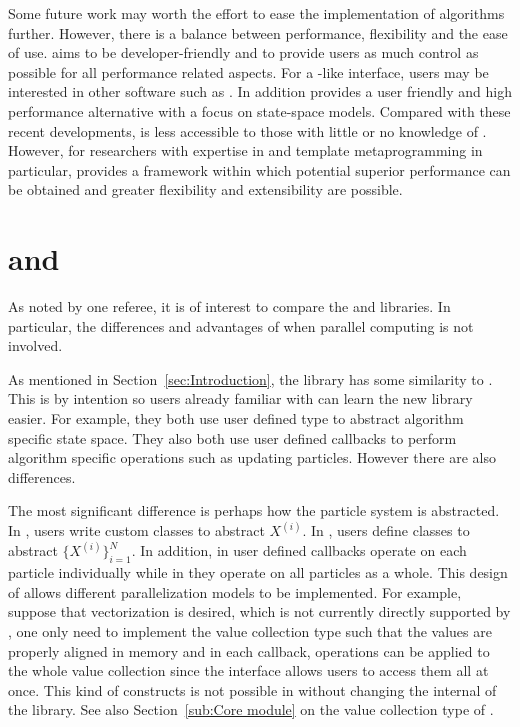 \documentclass[11pt, fontset=Minion, showoverfull,
bib, mintcode, minted=cache]{marticle}
\begin{document}
Some future work may worth the effort to ease the implementation of \smc
algorithms further. However, there is a balance between performance,
flexibility and the ease of use. \vsmc aims to be developer-friendly and to
provide users as much control as possible for all performance related aspects.
For a \lbugs-like interface, users may be interested in other software such as
\fbiips \parencite{BiiPS}. In addition \flibbi \parencite{Murray2013bi}
provides a user friendly and high performance alternative with a focus on
state-space models. Compared with these recent developments, \vsmc is less
accessible to those with little or no knowledge of \cpp. However, for
researchers with expertise in \cpp and template metaprogramming in particular,
\vsmc provides a framework within which potential superior performance can be
obtained and greater flexibility and extensibility are possible.

\clearpage
\appendix

\section{\protect\vsmc and \protect\smctc}
\label{sec:vsmc and smctc}

As noted by one referee, it is of interest to compare the \vsmc and \lsmctc
libraries. In particular, the differences and advantages of \vsmc when
parallel computing is not involved.

As mentioned in Section~\ref{sec:Introduction}, the \vsmc library has some
similarity to \lsmctc. This is by intention so users already familiar with
\lsmctc can learn the new library easier. For example, they both use user
defined type to abstract algorithm specific state space. They also both use
user defined callbacks to perform algorithm specific operations such as
updating particles. However there are also differences.

The most significant difference is perhaps how the particle system is
abstracted. In \lsmctc, users write custom classes to abstract $X^{(i)}$. In
\vsmc, users define classes to abstract $\{X^{(i)}\}_{i=1}^N$. In addition, in
\lsmctc user defined callbacks operate on each particle individually while in
\vsmc they operate on all particles as a whole. This design of \vsmc allows
different parallelization models to be implemented. For example, suppose that
\simd vectorization is desired, which is not currently directly supported by
\vsmc, one only need to implement the value collection type such that the
values are properly aligned in memory and in each callback, \simd operations
can be applied to the whole value collection since the \vsmc interface allows
users to access them all at once. This kind of constructs is not possible in
\lsmctc without changing the internal of the library. See also
Section~\ref{sub:Core module} on the value collection type of \vsmc.
\end{document}
